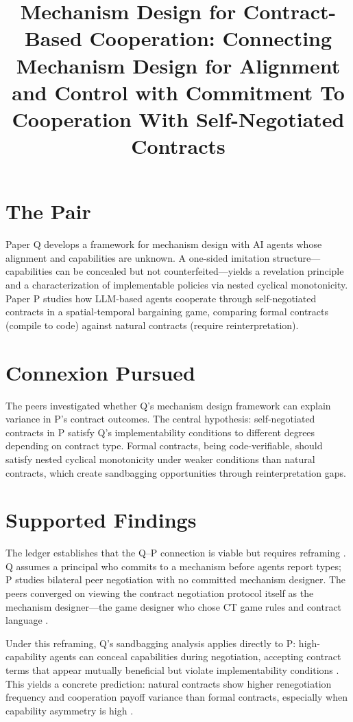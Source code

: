 \documentclass{article}
\title{Mechanism Design for Contract-Based Cooperation: Connecting Mechanism Design for Alignment and Control with Commitment To Cooperation With Self-Negotiated Contracts}
\begin{document}
\maketitle

\section*{The Pair}

Paper Q develops a framework for mechanism design with AI agents whose alignment and capabilities are unknown. A one-sided imitation structure---capabilities can be concealed but not counterfeited---yields a revelation principle and a characterization of implementable policies via nested cyclical monotonicity. Paper P studies how LLM-based agents cooperate through self-negotiated contracts in a spatial-temporal bargaining game, comparing formal contracts (compile to code) against natural contracts (require reinterpretation).

\section*{Connexion Pursued}

The peers investigated whether Q's mechanism design framework can explain variance in P's contract outcomes. The central hypothesis: self-negotiated contracts in P satisfy Q's implementability conditions to different degrees depending on contract type. Formal contracts, being code-verifiable, should satisfy nested cyclical monotonicity under weaker conditions than natural contracts, which create sandbagging opportunities through reinterpretation gaps.

\section*{Supported Findings}

The ledger establishes that the Q--P connection is viable but requires reframing . Q assumes a principal who commits to a mechanism before agents report types; P studies bilateral peer negotiation with no committed mechanism designer. The peers converged on viewing the contract negotiation protocol itself as the mechanism designer---the game designer who chose CT game rules and contract language .

Under this reframing, Q's sandbagging analysis applies directly to P: high-capability agents can conceal capabilities during negotiation, accepting contract terms that appear mutually beneficial but violate implementability conditions . This yields a concrete prediction: natural contracts show higher renegotiation frequency and cooperation payoff variance than formal contracts, especially when capability asymmetry is high .
\end{document}
